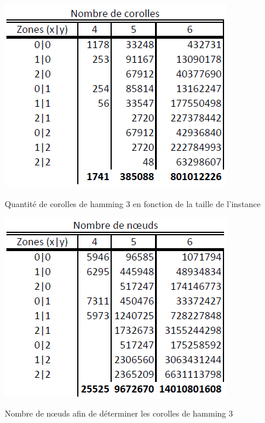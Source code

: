 \begin{appendices}
	\begin{table}[H]
		\centering
		\includegraphics[width=0.6\linewidth]{images/resultats_corolle_hamming_3}
		\caption{Quantité de corolles de hamming 3 en fonction de la taille de l'instance}
	\end{table}
	\begin{table}[H]
		\centering
		\includegraphics[width=0.6\linewidth]{images/resultats_corolle_hamming_3_noeuds}
		\caption{Nombre de n\oe uds afin de déterminer les corolles de hamming 3}
	\end{table}
\end{appendices}